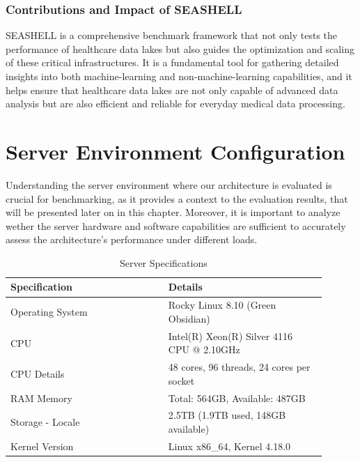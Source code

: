 \subsubsection{Contributions and Impact of SEASHELL}
SEASHELL is a comprehensive benchmark framework that not only tests the performance of healthcare data lakes but also guides the optimization and scaling of these critical infrastructures. It is a fundamental tool for gathering detailed insights into both machine-learning and non-machine-learning capabilities, and it helps ensure that healthcare data lakes are not only capable of advanced data analysis but are also efficient and reliable for everyday medical data processing.


\section{Server Environment Configuration}

Understanding the server environment where our architecture is evaluated is crucial for benchmarking, as it provides a context to the evaluation results, that will be presented later on in this chapter. Moreover, it is important to analyze wether the server hardware and software capabilities are sufficient to accurately assess the architecture's performance under different loads.

\begin{table}[h!]
    \centering
    \begin{tabular}{| P{0.45\linewidth} | P{0.45\linewidth} |}
    \hline
    \textbf{Specification}         & \textbf{Details}                         \\ \hline
    Operating System               & Rocky Linux 8.10 (Green Obsidian)        \\ \hline
    CPU                            & Intel(R) Xeon(R) Silver 4116 CPU @ 2.10GHz \\ \hline
    CPU Details                    & 48 cores, 96 threads, 24 cores per socket \\ \hline
    RAM Memory                         & Total: 564GB, Available: 487GB \\ \hline
    Storage - Locale               & 2.5TB (1.9TB used, 148GB available)       \\ \hline
    Kernel Version                 & Linux x86\_64, Kernel 4.18.0              \\ \hline
    \end{tabular}
    \caption{Server Specifications}
    \label{tab:server_specs}
\end{table}


